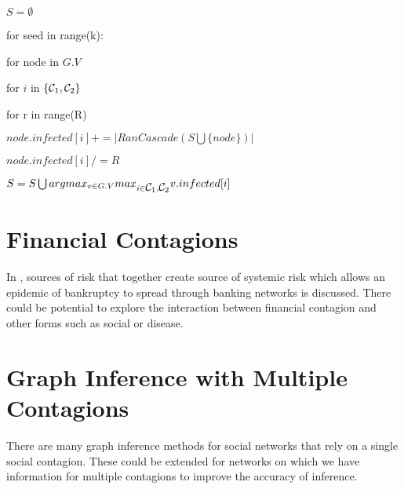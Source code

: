 \documentclass[11pt]{article}
\begin{document}
$S = \emptyset$

for seed in range(k):

\indent for node in $G.V$

\indent\indent for $i$ in $\{\mbox{$\mathcal{C}_1$}{}, \mbox{$\mathcal{C}_2$}{}\}$

\indent\indent\indent for r in range(R)

\indent\indent\indent\indent $node.infected[i] += |RanCascade(S \bigcup \{node\})|$ 

\indent\indent\indent $node.infected[i] /= R$

\indent\indent $S = S \bigcup argmax_{v\in G.V}max_{i\in\mbox{$\mathcal{C}_1$}{}, \mbox{$\mathcal{C}_2$}{}} v.infected[i]$ 




\section{Financial Contagions}

In \cite{Cacciolo}, sources of risk that together create
source of systemic risk which allows an epidemic of bankruptcy to
spread through banking networks is discussed. There could be potential
to explore the interaction between financial contagion and other
forms such as social or disease.

\section{Graph Inference with Multiple Contagions}

There are many graph inference methods for social networks that
rely on a single social contagion. These could be extended for
networks on which we have information for multiple contagions to
improve the accuracy of inference.





\end{document}
